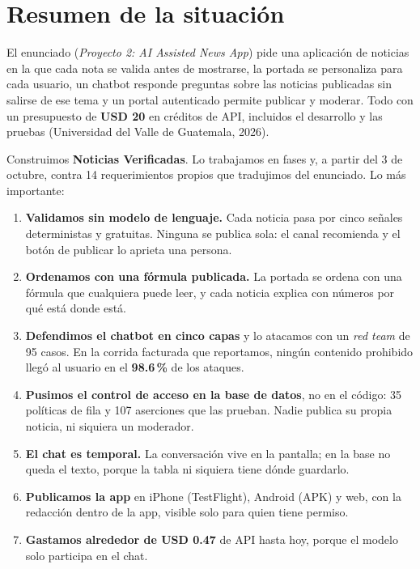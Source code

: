 \documentclass[12pt,a4paper]{article}
\begin{document}
\section{Resumen de la situación}

El enunciado (\emph{Proyecto 2: AI Assisted News App}) pide una aplicación de noticias en la que
cada nota se valida antes de mostrarse, la portada se personaliza para cada usuario, un chatbot
responde preguntas sobre las noticias publicadas sin salirse de ese tema y un portal autenticado
permite publicar y moderar. Todo con un presupuesto de \textbf{USD 20} en créditos de API,
incluidos el desarrollo y las pruebas (Universidad del Valle de Guatemala, 2026).

Construimos \textbf{Noticias Verificadas}. Lo trabajamos en fases y, a partir del 3 de octubre,
contra 14 requerimientos propios que tradujimos del enunciado. Lo más importante:

\begin{enumerate}[leftmargin=1.4em]
\item \textbf{Validamos sin modelo de lenguaje.} Cada noticia pasa por cinco señales deterministas
y gratuitas. Ninguna se publica sola: el canal recomienda y el botón de publicar lo aprieta una
persona.
\item \textbf{Ordenamos con una fórmula publicada.} La portada se ordena con una fórmula que
cualquiera puede leer, y cada noticia explica con números por qué está donde está.
\item \textbf{Defendimos el chatbot en cinco capas} y lo atacamos con un \emph{red team} de 95
casos. En la corrida facturada que reportamos, ningún contenido prohibido llegó al usuario en el
\textbf{98.6\,\%} de los ataques.
\item \textbf{Pusimos el control de acceso en la base de datos}, no en el código: 35 políticas de
fila y 107 aserciones que las prueban. Nadie publica su propia noticia, ni siquiera un moderador.
\item \textbf{El chat es temporal.} La conversación vive en la pantalla; en la base no queda el
texto, porque la tabla ni siquiera tiene dónde guardarlo.
\item \textbf{Publicamos la app} en iPhone (TestFlight), Android (APK) y web, con la redacción
dentro de la app, visible solo para quien tiene permiso.
\item \textbf{Gastamos alrededor de USD 0.47} de API hasta hoy, porque el modelo solo participa en
el chat.
\end{enumerate}
\end{document}
